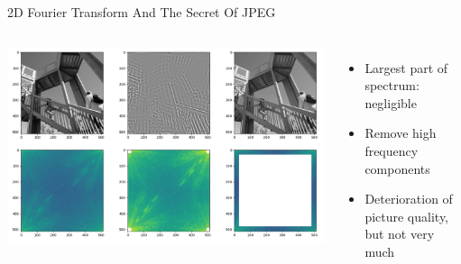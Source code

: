 
\begin{frame}{2D Fourier Transform And The Secret Of JPEG}
%
\begin{columns}
\includegraphics[width=\linewidth]{./gfx/05-FFT-2D}
%
\begin{itemize}
\item Largest part of spectrum: negligible
\item Remove high frequency components 
\item[\Thus] Deterioration of picture quality, but not very much
\end{itemize}
\end{columns}
%
\end{frame}


